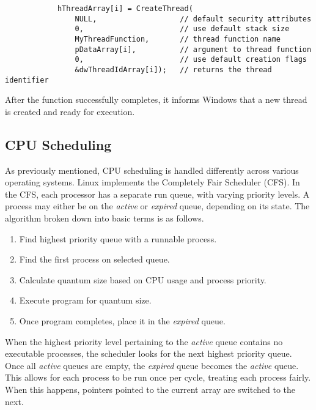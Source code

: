 \documentclass[10pt, onecolumn]{IEEEtran}
\begin{document}
        \begin{lstlisting}
            hThreadArray[i] = CreateThread( 
                NULL,                   // default security attributes
                0,                      // use default stack size  
                MyThreadFunction,       // thread function name
                pDataArray[i],          // argument to thread function 
                0,                      // use default creation flags 
                &dwThreadIdArray[i]);   // returns the thread identifier 
        \end{lstlisting}
        
        After the function successfully completes, it informs Windows that a new thread is created and ready for execution.
    
    
    \subsection*{CPU Scheduling}
        As previously mentioned, CPU scheduling is handled differently across various operating systems. Linux implements the Completely Fair Scheduler (CFS). In the CFS, each processor has a separate run queue, with varying priority levels. A process may either be on the \textit{active} or \textit{expired} queue, depending on its state. The algorithm broken down into basic terms is as follows.
        
        \begin{enumerate}
            \item Find highest priority queue with a runnable process.
            \item Find the first process on selected queue.
            \item Calculate quantum size based on CPU usage and process priority.
            \item Execute program for quantum size.
            \item Once program completes, place it in the \textit{expired} queue.
        \end{enumerate}
        
        When the highest priority level pertaining to the \textit{active} queue contains no executable processes, the scheduler looks for the next highest priority queue. Once all \textit{active} queues are empty, the \textit{expired} queue becomes the \textit{active} queue. This allows for each process to be run once per cycle, treating each process fairly. When this happens, pointers pointed to the current array are switched to the next.
        
\end{document}
